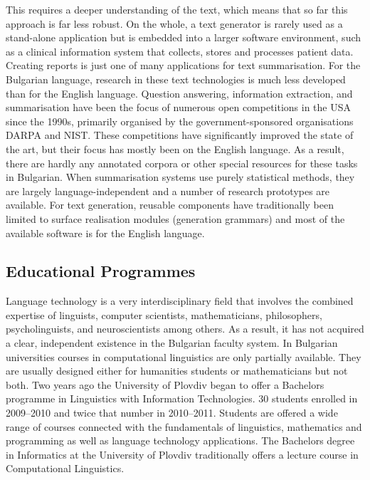 \documentclass[]{../../metanetpaper}
\begin{document}
\begin{multicols}{2}

This requires a deeper understanding of the text, which means that so far this approach is far less robust. On the whole, a text generator is rarely used as a stand-alone application but is embedded into a larger software environment, such as a clinical information system that collects, stores and processes patient data. Creating reports is just one of many applications for text summarisation. 
For the Bulgarian language, research in these text technologies is much less developed than for the English language. Question answering, information extraction, and summarisation have been the focus of numerous open competitions in the USA since the 1990s, primarily organised by the government-sponsored organisations DARPA and NIST. These competitions have significantly improved the state of the art, but their focus has mostly been on the English language. As a result, there are hardly any annotated corpora or other special resources for these tasks in Bulgarian. When summarisation systems use purely statistical methods, they are largely language-independent and a number of research prototypes are available. For text generation, reusable components have traditionally been limited to surface realisation modules (generation grammars) and most of the available software is for the English language. 

\subsection{Educational Programmes}

Language technology is a very interdisciplinary field that involves the combined expertise of linguists, computer scientists, mathematicians, philosophers, psycholinguists, and neuroscientists among others. As a result, it has not acquired a clear, independent existence in the Bulgarian faculty system. In Bulgarian universities courses in computational linguistics are only partially available. They are usually designed either for humanities students or mathematicians but not both. Two years ago the University of Plovdiv began to offer a Bachelors programme in Linguistics with Information Technologies. 30 students enrolled in 2009--2010 and twice that number in 2010--2011. Students are offered a wide range of courses connected with the fundamentals of linguistics, mathematics and programming as well as language technology applications. The Bachelors degree in Informatics at the University of Plovdiv traditionally offers a lecture course in Computational Linguistics. 


\end{multicols}
\end{document}
